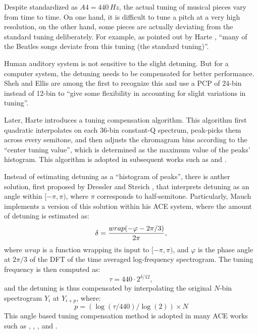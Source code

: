 Despite standardized as $A4 = 440\,Hz$, the actual tuning of musical pieces vary from time to time. On one hand, it is difficult to tune a pitch at a very high resolution, on the other hand, some pieces are actually deviating from the standard tuning deliberately. For example, as pointed out by Harte \cite{harte2010towards}, ``many of the Beatles songs deviate from this tuning (the standard tuning)''.

Human auditory system is not sensitive to the slight detuning. But for a computer system, the detuning needs to be compensated for better performance. Sheh and Ellis \cite{sheh2003chord} are among the first to recognize this and use a PCP of 24-bin instead of 12-bin to ``give some flexibility in accounting for slight variations in tuning''.

Later, Harte \cite{harte2005automatic} introduces a tuning compensation algorithm. This algorithm first quadratic interpolates on each 36-bin constant-Q spectrum, peak-picks them across every semitone, and then adjusts the chromagram bins according to the ``center tuning value'', which is determined as the maximum value of the peaks' histogram. This algorithm is adopted in subsequent works such as \cite{bello2005robust} and \cite{harte2006detecting}.

Instead of estimating detuning as a ``histogram of peaks'', there is anther solution, first proposed by Dressler and Streich \cite{dressler2007tuning}, that interprets detuning as an angle within $[-\pi,\pi)$, where $\pi$ corresponds to half-semitone. Particularly, Mauch \cite{mauch2010automatic} implements a version of this solution within his ACE system, where the amount of detuning is estimated as:
\begin{equation}\label{eq:2-tuning}
\delta = { {wrap(-\varphi-{2\pi}/3)} \over {2\pi} },
\end{equation}
where $wrap$ is a function wrapping its input to $[-\pi,\pi)$, and $\varphi$ is the phase angle at $2\pi/3$ of the DFT of the time averaged log-frequency spectrogram. The tuning frequency is then computed as:
\begin{equation}
\tau=440\cdot2^{\delta/12},
\end{equation}
and the detuning is thus compensated by interpolating the original $N$-bin spectrogram $Y_i$ at $Y_{i+p}$, where:
\begin{equation}
p = (\log(\tau / 440) / \log(2)) \times N
\end{equation}
This angle based tuning compensation method is adopted in many ACE works such as \cite{papadopoulos2007large}, \cite{papadopoulos2008simultaneous}, \cite{mauch2008discrete}, \cite{reed2009minimum} and \cite{noland2009influences}.

